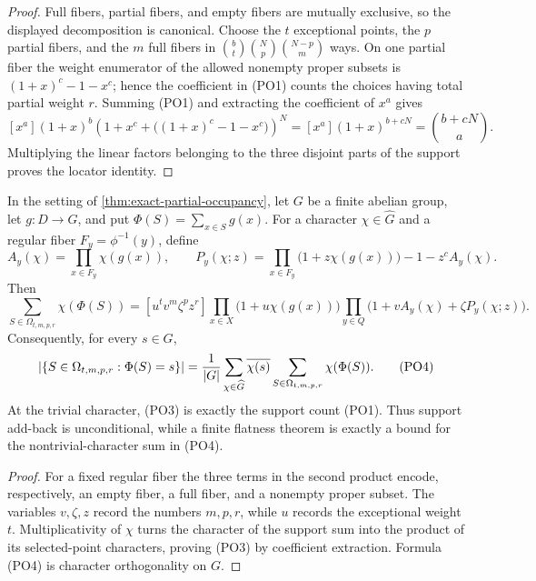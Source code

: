 \documentclass[11pt,a4paper]{amsart}
\numberwithin{equation}{section}
\theoremstyle{remark}
\begin{document}
\begin{proof}
Full fibers, partial fibers, and empty fibers are mutually exclusive, so
the displayed decomposition is canonical.  Choose the \(t\) exceptional
points, the \(p\) partial fibers, and the \(m\) full fibers in
\(\binom bt\binom Np\binom{N-p}m\) ways.  On one partial fiber the
weight enumerator of the allowed nonempty proper subsets is
\((1+x)^c-1-x^c\); hence the coefficient in \textup{(PO1)} counts the
choices having total partial weight \(r\).  Summing \textup{(PO1)} and
extracting the coefficient of \(x^a\) gives
\[
 [x^a](1+x)^b
 \left(1+x^c+\bigl((1+x)^c-1-x^c\bigr)\right)^N
 =[x^a](1+x)^{b+cN}=\binom{b+cN}{a}.
\]
Multiplying the linear factors belonging to the three disjoint parts of
the support proves the locator identity.
\end{proof}

\begin{proposition}
\label{prop:partial-occupancy-fourier}
In the setting of \cref{thm:exact-partial-occupancy}, let \(G\) be a
finite abelian group, let \(g:D\to G\), and put
\(\Phi(S)=\sum_{x\in S}g(x)\).  For a character
\(\chi\in\widehat G\) and a regular fiber \(F_y=\phi^{-1}(y)\), define
\[
 A_y(\chi)=\prod_{x\in F_y}\chi(g(x)),\qquad
 P_y(\chi;z)=
 \prod_{x\in F_y}\bigl(1+z\chi(g(x))\bigr)-1-z^cA_y(\chi).
\]
Then
\[
 \sum_{S\in\Omega_{t,m,p,r}}\chi(\Phi(S))
 =[u^tv^m\zeta^pz^r]
 \prod_{x\in X}\bigl(1+u\chi(g(x))\bigr)
 \prod_{y\in Q}
 \bigl(1+vA_y(\chi)+\zeta P_y(\chi;z)\bigr).          \tag{PO3}
\]
Consequently, for every \(s\in G\),
\[
 \lvert \{S\in\Omega_{t,m,p,r}:\Phi(S)=s\}\rvert
 =\frac1{\lvert G\rvert}\sum_{\chi\in\widehat G}
   \overline{\chi(s)}
   \sum_{S\in\Omega_{t,m,p,r}}\chi(\Phi(S)).         \tag{PO4}
\]
At the trivial character, \textup{(PO3)} is exactly the support count
\textup{(PO1)}.  Thus support add-back is unconditional, while a finite
flatness theorem is exactly a bound for the nontrivial-character sum in
\textup{(PO4)}.
\end{proposition}

\begin{proof}
For a fixed regular fiber the three terms in the second product encode,
respectively, an empty fiber, a full fiber, and a nonempty proper subset.
The variables \(v,\zeta,z\) record the numbers \(m,p,r\), while \(u\)
records the exceptional weight \(t\).  Multiplicativity of \(\chi\) turns
the character of the support sum into the product of its selected-point
characters, proving \textup{(PO3)} by coefficient extraction.
Formula \textup{(PO4)} is character orthogonality on \(G\).
\end{proof}
\end{document}
